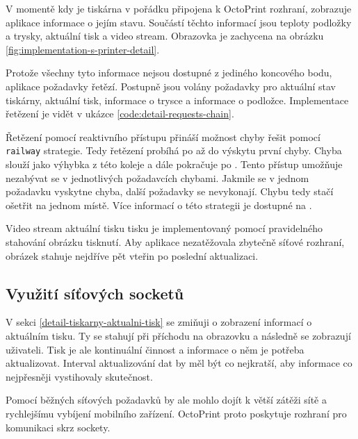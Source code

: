 V momentě kdy je tiskárna v pořádku připojena k OctoPrint rozhraní, zobrazuje aplikace informace o jejím stavu.
Součástí těchto informací jsou teploty podložky a trysky, aktuální tisk a video stream.
Obrazovka je zachycena na obrázku \ref{fig:implementation-s-printer-detail}.


Protože všechny tyto informace nejsou dostupné z jediného koncového bodu, aplikace požadavky řetězí.
Postupně jsou volány požadavky pro aktuální stav tiskárny, aktuální tisk, informace o trysce a informace o podložce.
Implementace řetězení je vidět v ukázce \ref{code:detail-requests-chain}.


Řetězení pomocí reaktivního přístupu přináší možnost chyby řešit pomocí \texttt{railway} strategie.
Tedy řetězení probíhá po  až do výskytu první chyby.
Chyba slouží jako výhybka z této koleje a dále pokračuje po .
Tento přístup umožňuje nezabývat se v jednotlivých požadavcích chybami.
Jakmile se v jednom požadavku vyskytne chyba, další požadavky se nevykonají.
Chybu tedy stačí ošetřit na jednom místě.
Více informací o této strategii je dostupné na \cite{fsharp-railway-strategy}.

Video stream aktuální tisku tisku je implementovaný pomocí pravidelného stahování obrázku tisknutí.
Aby aplikace nezatěžovala zbytečně síťové rozhraní, obrázek stahuje nejdříve pět vteřin po poslední aktualizaci.

\subsection{Využití síťových socketů}

V sekci \ref{detail-tiskarny-aktualni-tisk} se zmiňuji o zobrazení informací o aktuálním tisku.
Ty se stahují při příchodu na obrazovku a následně se zobrazují uživateli.
Tisk je ale kontinuální činnost a informace o něm je potřeba aktualizovat.
Interval aktualizování dat by měl být co nejkratší, aby informace co nejpřesněji vystihovaly skutečnost.

Pomocí běžných síťových požadavků by ale mohlo dojít k větší zátěži sítě a rychlejšímu vybíjení mobilního zařízení.
OctoPrint proto poskytuje rozhraní pro komunikaci skrz sockety.

